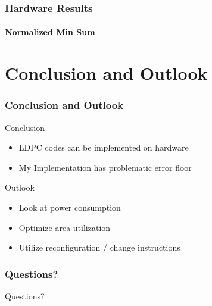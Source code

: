 \documentclass[	%
				]{beamer}
\begin{document}
\begin{frame}
	\frametitle{Hardware Results}
	\framesubtitle{Normalized Min Sum}
	\centering
\end{frame}
\section{Conclusion and Outlook}
\begin{frame}
	\frametitle{Conclusion and Outlook}
	{\Large Conclusion}
	\begin{itemize}
		\item LDPC codes can be implemented on hardware
		\item My Implementation has problematic error floor
	\end{itemize}
	{\Large Outlook}
	\begin{itemize}
		\item Look at power consumption
		\item Optimize area utilization
		\item Utilize reconfiguration / change instructions
	\end{itemize}
\end{frame}

\begin{frame}
	\frametitle{Questions?}
	\centering
	\Huge
	Questions?
\end{frame}
\end{document}
